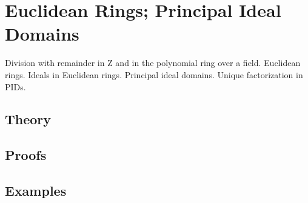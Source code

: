 
\section{Euclidean Rings; Principal Ideal Domains}
\label{sec:2.2.14-division-euclidean}

\begin{ticket}
Division with remainder in Z and in the polynomial ring over a field. Euclidean rings. Ideals in Euclidean rings. Principal ideal domains. Unique factorization in PIDs.
\end{ticket}

\subsection*{Theory}

\subsection*{Proofs}

\subsection*{Examples}
